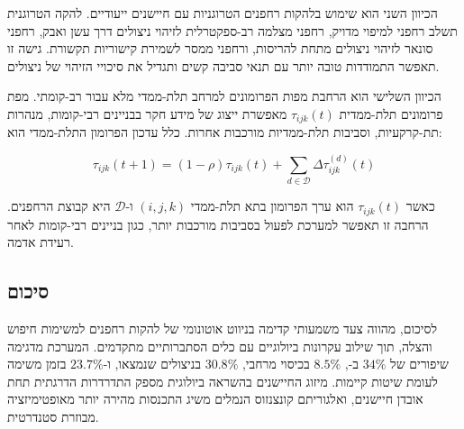 הכיוון השני הוא שימוש בלהקות רחפנים הטרוגניות עם חיישנים ייעודיים. להקה הטרוגנית תשלב רחפני  למיפוי מדויק, רחפני מצלמה רב-ספקטרלית לזיהוי ניצולים דרך עשן ואבק, רחפני סונאר לזיהוי ניצולים מתחת להריסות, ורחפני ממסר לשמירת קישוריות תקשורת. גישה זו תאפשר התמודדות טובה יותר עם תנאי סביבה קשים ותגדיל את סיכויי הזיהוי של ניצולים.

הכיוון השלישי הוא הרחבת מפות הפרומונים למרחב תלת-ממדי מלא עבור  רב-קומתי. מפת פרומונים תלת-ממדית $\tau_{ijk}(t)$ מאפשרת ייצוג של מידע חקר בבניינים רבי-קומות, מנהרות תת-קרקעיות, וסביבות תלת-ממדיות מורכבות אחרות. כלל עדכון הפרומון התלת-ממדי הוא:

\begin{equation}
\tau_{ijk}(t+1) = (1-\rho)\tau_{ijk}(t) + \sum_{d \in \mathcal{D}} \Delta\tau_{ijk}^{(d)}(t)
\label{eq:ch09_3d_pheromone}
\end{equation}

כאשר $\tau_{ijk}(t)$ הוא ערך הפרומון בתא תלת-ממדי $(i,j,k)$ ו-$\mathcal{D}$ היא קבוצת הרחפנים. הרחבה זו תאפשר למערכת לפעול בסביבות מורכבות יותר, כגון בניינים רבי-קומות לאחר רעידת אדמה.

\begin{table}[htbp]
\centering
\caption{סיכום מגבלות המערכת המוצעת ופתרונות עתידיים מוצעים.}
\label{tab:ch09_limitations}
\end{table}

\subsection{סיכום}
\label{sec:ch09_summary}

לסיכום,  מהווה צעד משמעותי קדימה בניווט אוטונומי של להקות רחפנים למשימות חיפוש והצלה, תוך שילוב עקרונות ביולוגיים עם כלים הסתברותיים מתקדמים. המערכת מדגימה שיפורים של $34\%$ ב-, $8.5\%$ בכיסוי מרחבי, $30.8\%$ בניצולים שנמצאו, ו-$23.7\%$ בזמן משימה לעומת שיטות קיימות. מיזוג החיישנים בהשראה ביולוגית מספק התדרדרות הדרגתית תחת אובדן חיישנים, ואלגוריתם קונצנזוס הנמלים משיג התכנסות מהירה יותר מאופטימיזציה מבוזרת סטנדרטית.

